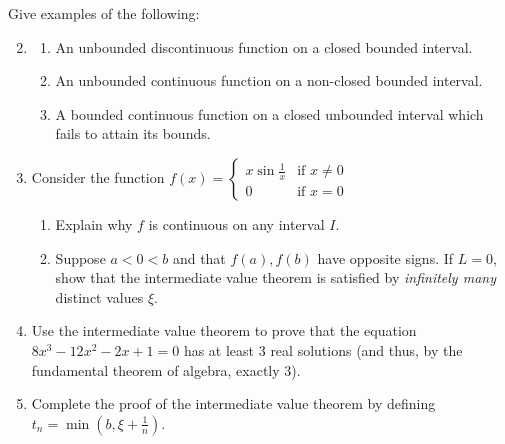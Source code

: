 \begin{exercises}
	\exstart Give examples of the following:\vspace{-5pt}
	\begin{enumerate}\setcounter{enumi}{1}  
	  \item[]\begin{enumerate}
	    \item An unbounded discontinuous function on a closed bounded interval.
	    \item An unbounded continuous function on a non-closed bounded interval.
	    \item A bounded continuous function on a closed unbounded interval which fails to attain its bounds.
		\end{enumerate}
		
	
		
		
		\item\label{exs:intvalinfty} Consider the function $f(x)=
		\begin{cases}
			x\sin\frac 1x&\text{if }x\neq 0\\
			0&\text{if }x=0
		\end{cases}$
		\begin{enumerate}
		  \item Explain why $f$ is continuous on any interval $I$.
		  \item Suppose $a<0<b$ and that $f(a),f(b)$ have opposite signs. If $L=0$, show that the intermediate value theorem is satisfied by \emph{infinitely many} distinct values $\xi$.
		\end{enumerate}

	
		\item Use the intermediate value theorem to prove that the equation $8x^3-12x^2-2x+1=0$ has at least 3 real solutions (and thus, by the fundamental theorem of algebra, exactly 3).
		
		
		\item\label{exs:ivtproof} Complete the proof of the intermediate value theorem by defining $t_n=\min(b,\xi+\frac 1n)$.
		

\end{enumerate}
\end{exercises}
